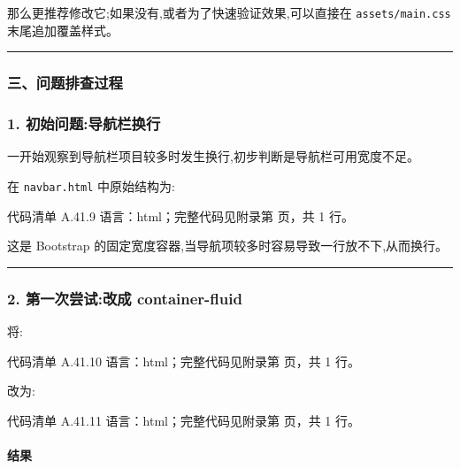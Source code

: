 \documentclass[lang=cn,scheme=chinese,color=blue,device=normal,toc=onecol,math=cm]{elegantbook}
\begin{document}
那么更推荐修改它;如果没有,或者为了快速验证效果,可以直接在 \texttt{assets/\allowbreak{}main.css} 末尾追加覆盖样式。\par


\medskip\hrule\medskip


\subsubsection{三、问题排查过程}


\subsubsection{1. 初始问题:导航栏换行}


一开始观察到导航栏项目较多时发生换行,初步判断是导航栏可用宽度不足。\par


在 \texttt{navbar.html} 中原始结构为:\par


\begin{codeindexbox}{代码清单 A.41.9}
语言：html；完整代码见附录第 \pageref{code:41:9} 页，共 1 行。
\end{codeindexbox}


这是 Bootstrap 的固定宽度容器,当导航项较多时容易导致一行放不下,从而换行。\par


\medskip\hrule\medskip


\subsubsection{2. 第一次尝试:改成 container-fluid}


将:\par


\begin{codeindexbox}{代码清单 A.41.10}
语言：html；完整代码见附录第 \pageref{code:41:10} 页，共 1 行。
\end{codeindexbox}


改为:\par


\begin{codeindexbox}{代码清单 A.41.11}
语言：html；完整代码见附录第 \pageref{code:41:11} 页，共 1 行。
\end{codeindexbox}


\paragraph{结果}
\end{document}
